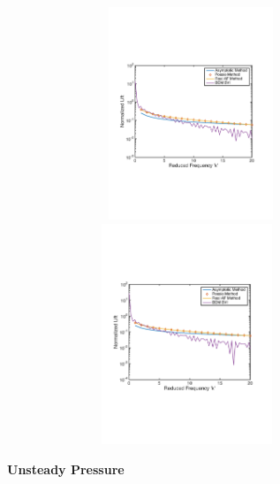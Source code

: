 \documentclass{article}
\begin{document}
\begin{figure}[h]
\centering
\begin{minipage}{0.5\textwidth}
	\centering
	\includegraphics[width = 3.5in, height = 2.5in]{NACA1106}
\end{minipage}%
\begin{minipage}{0.5\textwidth}
	\centering
	\includegraphics[width = 3.4in, height = 2.6in]{NACA2106}
\end{minipage}%
\end{figure}

\newpage
\noindent \textbf{Unsteady Pressure}\\ \\
\end{document}
